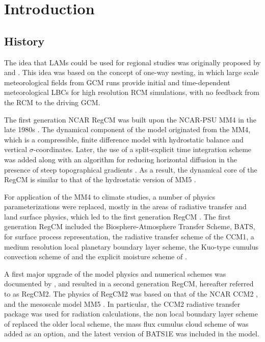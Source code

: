 \section{Introduction}

\subsection{History}
The idea that \ac{LAMs} could be used for regional studies was originally proposed by \citet{Dickinson_89} and \citet{Giorgi_90}. This idea was based on the concept of one-way nesting, in which large scale meteorological fields from \ac{GCM} runs provide initial and time-dependent meteorological \ac{LBCs} for high resolution \ac{RCM} simulations, with no feedback from the \ac{RCM} to the driving \ac{GCM}.

The first generation NCAR \ac{RegCM} was built upon the \ac{NCAR}-\ac{PSU} \ac{MM4} in the late 1980s \citep{Dickinson_89,Giorgi_89}. The dynamical component of the model originated from the \ac{MM4}, which is a compressible, finite difference model with hydrostatic balance and vertical $\sigma$-coordinates. Later, the use of a split-explicit time integration scheme was added along with an algorithm for reducing horizontal diffusion in the presence of steep topographical gradients \citep{Giorgi_93,Giorgi_93b}.  As a result, the dynamical core of the \ac{RegCM} is similar to that of the hydrostatic version of \ac{MM5} \citep{Grell_94}.

For application of the \ac{MM4} to climate studies, a number of physics parameterizations were replaced, mostly in the areas of radiative transfer and land surface physics, which led to the first generation \ac{RegCM} \citep{Dickinson_89,Giorgi_90}. The first generation \ac{RegCM} included the Biosphere-Atmosphere Transfer Scheme, BATS, \citep{Dickinson_86} for surface process representation, the radiative transfer scheme of the \ac{CCM1}, a medium resolution local planetary boundary layer scheme, the Kuo-type cumulus convection scheme of \citep{Anthes_77} and the explicit moisture scheme of \citep{Hsie_84}.

A first major upgrade of the model physics and numerical schemes was documented by \citep{Giorgi_93,Giorgi_93b}, and resulted in a second generation \ac{RegCM}, hereafter referred to as \ac{RegCM2}. The physics of \ac{RegCM2} was based on that of the \ac{NCAR} \ac{CCM2} \citep{Hack_93}, and the mesoscale model \ac{MM5} \citep{Grell_94}. In particular, the \ac{CCM2} radiative transfer package \citep{Briegleb_92} was used for radiation calculations, the non local boundary layer scheme of \citep{Holtslag_90} replaced the older local scheme, the mass flux cumulus cloud scheme of \citep{Grell_93} was added as an option, and the latest version of BATS1E \citep{Dickinson_93} was included in the model.

